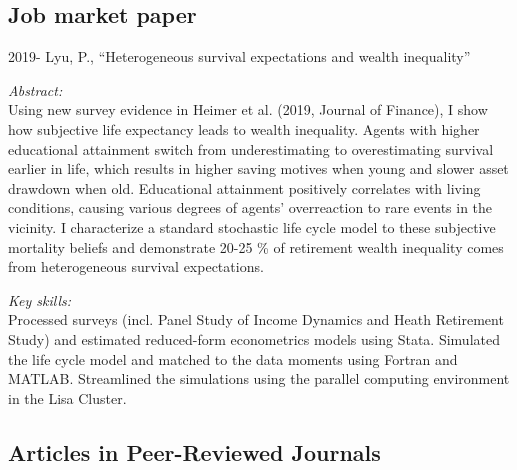 \documentclass[12pt,letterpaper]{report}
\begin{document}
	\subsection*{Job market paper}

	\begin{tablist}
	
	\item[2019-] \tab  Lyu, P., \enquote{Heterogeneous survival expectations and wealth inequality}
	\medskip
	
	\textit{Abstract:}\\
	
	Using new survey evidence in Heimer et al. (2019, Journal of Finance), I show how subjective life expectancy leads to wealth inequality. Agents with higher educational attainment switch from underestimating to overestimating survival earlier in life, which results in higher saving motives when young and slower asset drawdown when old. Educational attainment positively correlates with living conditions, causing various degrees of agents' overreaction to rare events in the vicinity. I characterize a standard stochastic life cycle model to these subjective mortality beliefs and demonstrate 20-25 \% of retirement wealth inequality comes from heterogeneous survival expectations.
	
	
	\medskip
	
	\textit{Key skills:}\\
	Processed surveys (incl. Panel Study of Income Dynamics and Heath Retirement Study) and estimated reduced-form econometrics models using Stata. Simulated the life cycle model and matched to the data moments using Fortran and MATLAB. Streamlined the simulations using the parallel computing environment in the Lisa Cluster.

	
	\end{tablist}

    \subsection*{Articles in Peer-Reviewed Journals}
\end{document}
